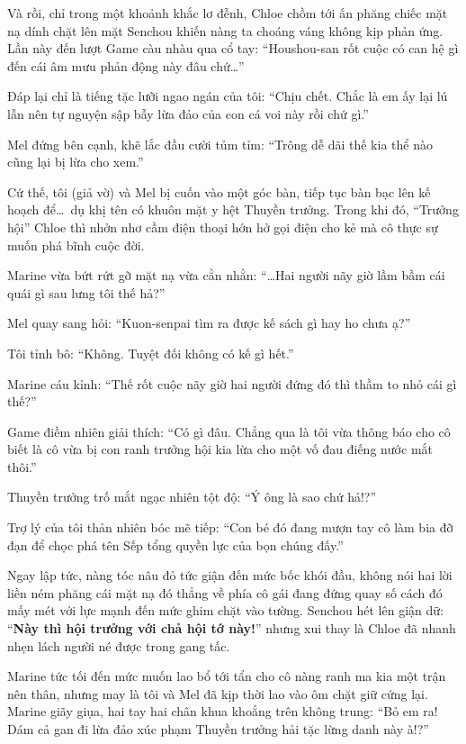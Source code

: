 \documentclass[../main.tex]{subfiles}
\begin{document}
Và rồi, chỉ trong một khoảnh khắc lơ đễnh, Chloe chồm tới ấn phăng chiếc mặt nạ dính chặt lên mặt Senchou khiến nàng ta choáng váng không kịp phản ứng. Lần này đến lượt Game càu nhàu qua cổ tay: ``Houshou-san rốt cuộc có can hệ gì đến cái âm mưu phản động này đâu chứ\dots''

Đáp lại chỉ là tiếng tặc lưỡi ngao ngán của tôi: ``Chịu chết. Chắc là em ấy lại lú lẫn nên tự nguyện sập bẫy lừa đảo của con cá voi này rồi chứ gì.''

Mel đứng bên cạnh, khẽ lắc đầu cười tủm tỉm: ``Trông dễ dãi thế kia thể nào cũng lại bị lừa cho xem.''

Cứ thế, tôi (giả vờ) và Mel bị cuốn vào một góc bàn, tiếp tục bàn bạc lên kế hoạch để\dots\ dụ khị tên có khuôn mặt y hệt Thuyền trưởng. Trong khi đó, ``Trưởng hội'' Chloe thì nhởn nhơ cầm điện thoại hớn hở gọi điện cho kẻ mà cô thực sự muốn phá bĩnh cuộc đời.

Marine vừa bứt rứt gỡ mặt nạ vừa cằn nhằn: ``\dots Hai người nãy giờ lầm bầm cái quái gì sau lưng tôi thế hả?''

Mel quay sang hỏi: ``Kuon-senpai tìm ra được kế sách gì hay ho chưa ạ?''

Tôi tỉnh bô: ``Không. Tuyệt đối không có kế gì hết.''

Marine cáu kỉnh: ``Thế rốt cuộc nãy giờ hai người đứng đó thì thầm to nhỏ cái gì thế?''

Game điềm nhiên giải thích: ``Có gì đâu. Chẳng qua là tôi vừa thông báo cho cô biết là cô vừa bị con ranh trưởng hội kia lừa cho một vố đau điếng nước mắt thôi.''

Thuyền trưởng trố mắt ngạc nhiên tột độ: ``Ý ông là sao chứ hả!?''

Trợ lý của tôi thản nhiên bóc mẽ tiếp: ``Con bé đó đang mượn tay cô làm bia đỡ đạn để chọc phá tên Sếp tổng quyền lực của bọn chúng đấy.''

Ngay lập tức, nàng tóc nâu đỏ tức giận đến mức bốc khói đầu, không nói hai lời liền ném phăng cái mặt nạ đó thẳng về phía cô gái đang đứng quay số cách đó mấy mét với lực mạnh đến mức ghim chặt vào tường. Senchou hét lên giận dữ: ``\textbf{Này thì hội trưởng với chả hội tớ này!}'' nhưng xui thay là Chloe đã nhanh nhẹn lách người né được trong gang tấc.


Marine tức tối đến mức muốn lao bổ tới tẩn cho cô nàng ranh ma kia một trận nên thân, nhưng may là tôi và Mel đã kịp thời lao vào ôm chặt giữ cứng lại. Marine giãy giụa, hai tay hai chân khua khoắng trên không trung: ``Bỏ em ra! Dám cả gan đi lừa đảo xúc phạm Thuyền trưởng hải tặc lừng danh này à!?''
\end{document}
